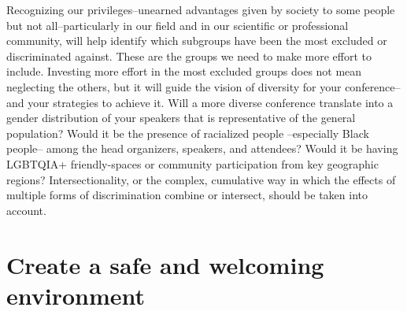 \documentclass[10pt,letterpaper]{article}
\begin{document}
Recognizing our privileges--unearned advantages given by society to some people but not all--particularly in our field and in our scientific or professional community, will help identify which subgroups have been the most excluded or discriminated against. 
These are the groups we need to make more effort to include. 
Investing more effort in the most excluded groups does not mean neglecting the others, but it will guide the vision of diversity for your conference--and your strategies to achieve it.
Will a more diverse conference translate into a gender distribution of your speakers that is representative of the general population? 
Would it be the presence of racialized people --especially Black people-- among the head organizers, speakers, and attendees? 
Would it be having LGBTQIA+ friendly-spaces or community participation from key geographic regions?
Intersectionality, or the complex, cumulative way in which the effects of multiple forms of discrimination combine or intersect, should be taken into account. 




\section{Create a safe and welcoming environment}
\label{rule_inclusion}
\end{document}
